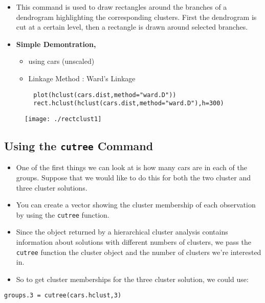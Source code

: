 \documentclass[12pt]{article}
\begin{document}
\begin{itemize}
	\item  This command is used to draw rectangles around the branches of a dendrogram highlighting the corresponding clusters. First the dendrogram is cut at a certain level, then a rectangle is drawn around selected branches.
	\item \textbf{Simple Demontration,}
	\begin{itemize}
		\item using cars (unscaled)
		\item Linkage Method : Ward's Linkage
	\end{itemize}
\end{itemize}

{
	\Large
	\begin{framed}
		\begin{verbatim}
		plot(hclust(cars.dist,method="ward.D"))
		rect.hclust(hclust(cars.dist,method="ward.D"),h=300)                                            
		\end{verbatim}
	\end{framed}
}
\newpage
\begin{figure}[h!]
	\centering
	\texttt{[image: ./rectclust1]}
\end{figure}







\newpage
\subsection{Using the \texttt{cutree} Command}
\begin{itemize}
\item One of the first things we can look at is how many cars are in each of the groups. Suppose that we would like to do this for both the two cluster and three cluster solutions. 
\item You can create a vector showing the cluster membership of each observation by using the \texttt{cutree} function. 
\item Since the object returned by a hierarchical cluster analysis contains information about solutions with different numbers of clusters, we pass the \texttt{cutree} function the cluster object and the number of clusters we're interested in.

\item  So to get cluster memberships for the three cluster solution, we could use:
\end{itemize}
\newpage
\begin{framed}
\begin{verbatim}
groups.3 = cutree(cars.hclust,3)
\end{verbatim}
\end{framed}
\end{document}
